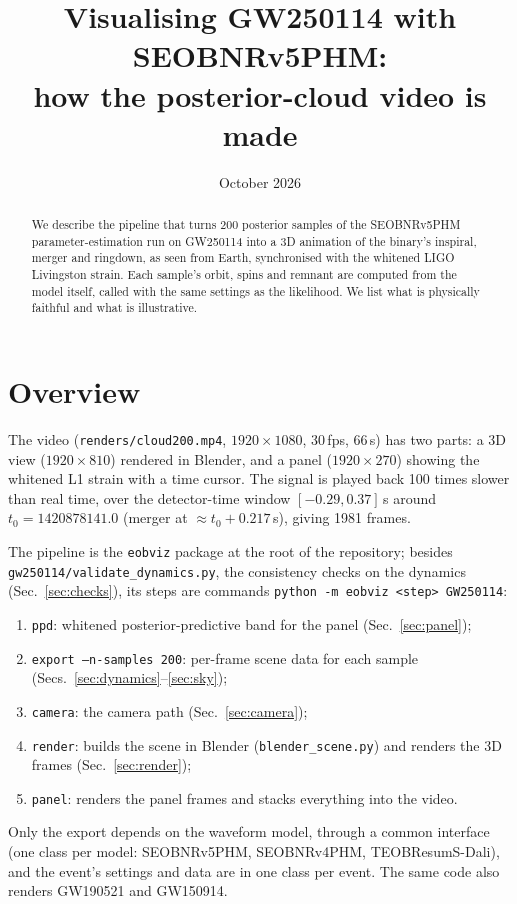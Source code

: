 \documentclass[11pt,a4paper]{article}
\title{Visualising GW250114 with SEOBNRv5PHM:\\how the posterior-cloud video is made}
\author{}
\date{October 2026}
\newcommand{\code}[1]{\texttt{#1}}
\begin{document}
\maketitle

\begin{abstract}
We describe the pipeline that turns 200 posterior samples of the SEOBNRv5PHM
parameter-estimation run on GW250114 into a 3D animation of the binary's inspiral, merger
and ringdown, as seen from Earth, synchronised with the whitened LIGO Livingston strain.
Each sample's orbit, spins and remnant are computed from the model itself, called with the
same settings as the likelihood. We list what is physically faithful and what is
illustrative.
\end{abstract}

\section{Overview}

The video (\code{renders/cloud200.mp4}, $1920\times1080$, 30\,fps, 66\,s) has two parts:
a 3D view ($1920\times810$) rendered in Blender, and a panel ($1920\times270$) showing the
whitened L1 strain with a time cursor. The signal is played back 100 times slower than
real time, over the detector-time window $[-0.29, 0.37]$\,s around
$t_0 = 1420878141.0$ (merger at $\approx t_0 + 0.217$\,s), giving 1981 frames.

The pipeline is the \code{eobviz} package at the root of the repository; besides
\code{gw250114/validate\_dynamics.py}, the consistency checks on the dynamics
(Sec.~\ref{sec:checks}), its steps are commands \code{python -m eobviz <step> GW250114}:
\begin{enumerate}
  \item \code{ppd}: whitened posterior-predictive band for the panel (Sec.~\ref{sec:panel});
  \item \code{export --n-samples 200}: per-frame scene data for each sample
        (Secs.~\ref{sec:dynamics}--\ref{sec:sky});
  \item \code{camera}: the camera path (Sec.~\ref{sec:camera});
  \item \code{render}: builds the scene in Blender (\code{blender\_scene.py}) and renders the
        3D frames (Sec.~\ref{sec:render});
  \item \code{panel}: renders the panel frames and stacks everything into the video.
\end{enumerate}
Only the export depends on the waveform model, through a common interface (one class per
model: SEOBNRv5PHM, SEOBNRv4PHM, TEOBResumS-Dali), and the event's settings and data are
in one class per event. The same code also renders GW190521 and GW150914.
\end{document}
